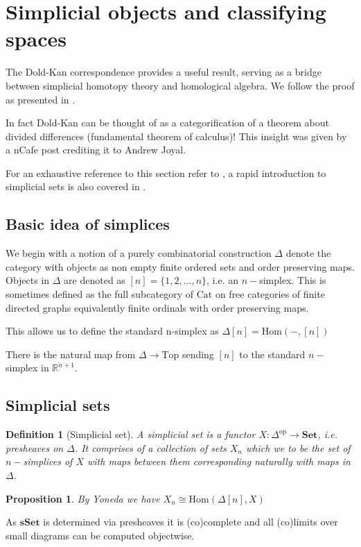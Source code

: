 \documentclass[12pt]{report}
\numberwithin{equation}{section}
\newcommand{\R}{\mathbb{R}}
\newcommand{\Hom}{{\mathrm{Hom}}}
\newtheorem{definition}[dummy]{Definition}
\newtheorem{proposition}[dummy]{Proposition}
\begin{document}
		
		\section{Simplicial objects and classifying spaces}

	The Dold-Kan correspondence provides a useful result, serving as a bridge between simplicial homotopy theory and homological algebra. We follow the proof as presented in \cite{Goerss_Jardine_2009}.	
	
	In fact Dold-Kan can be thought of as a categorification of a theorem about divided differences (fundamental theorem of calculus)! This insight was given by a nCafe post \cite{ncafedk} crediting it to Andrew Joyal.
	
		For an exhaustive reference to this section refer to \cite{Goerss_Jardine_2009}, a rapid introduction to simplicial sets is also covered in \cite{Riehl2011ALI}.
	\subsection{Basic idea of simplices}
	We begin with a notion of a purely combinatorial construction $\Delta$ denote the category with objects as non empty finite ordered sets and order preserving maps. Objects in $\Delta$ are denoted as $[n]=\{1,2,\dots,n\}$, i.e. an $n-$simplex. This is sometimes defined as the full subcategory of $\mathrm{Cat}$ on free categories of finite directed graphs equivalently finite ordinals with order preserving maps.
	
	
	This allows us to define the standard n-simplex as $\Delta[n]=\Hom(-,[n])$
	
	There is the natural map from $\Delta \to \mathrm{Top}$ sending $[n]$ to the standard $n-$simplex in $\R^{n+1}$.
	
	\subsection{Simplicial sets}
	
	\begin{definition}[Simplicial set]
		A simplicial set is a functor $X: \Delta^\mathrm{op} \to \mathbf{Set}$, i.e. presheaves on $\Delta$. It comprises of a collection of sets $X_n$ which we to be the set of $n-$simplices of $X$ with maps between them corresponding naturally with maps in $\Delta$.
	\end{definition}
	\begin{proposition}
		By Yoneda we have $X_n\cong \Hom(\Delta[n],X)$
	\end{proposition}
	As $\mathbf{sSet}$ is determined via presheaves it is (co)complete and all (co)limits over small diagrams can be computed objectwise. 
	
\end{document}
